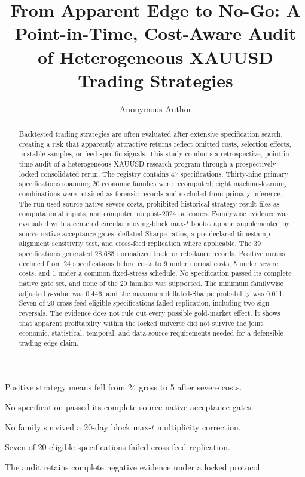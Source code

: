 \documentclass[a4paper,fleqn]{cas-sc}
\begin{document}
\let\WriteBookmarks\relax
\def\floatpagepagefraction{.8}
\def\textpagefraction{.1}

\title[mode=title]{From Apparent Edge to No-Go: A Point-in-Time, Cost-Aware Audit of Heterogeneous XAUUSD Trading Strategies}

\author[1]{Anonymous Author}

\begin{abstract}
Backtested trading strategies are often evaluated after extensive specification search, creating a risk that apparently attractive returns reflect omitted costs, selection effects, unstable samples, or feed-specific signals. This study conducts a retrospective, point-in-time audit of a heterogeneous XAUUSD research program through a prospectively locked consolidated rerun. The registry contains 47 specifications. Thirty-nine primary specifications spanning 20 economic families were recomputed; eight machine-learning combinations were retained as forensic records and excluded from primary inference. The run used source-native severe costs, prohibited historical strategy-result files as computational inputs, and computed no post-2024 outcomes. Familywise evidence was evaluated with a centered circular moving-block max-$t$ bootstrap and supplemented by source-native acceptance gates, deflated Sharpe ratios, a pre-declared timestamp-alignment sensitivity test, and cross-feed replication where applicable. The 39 specifications generated 28,685 normalized trade or rebalance records. Positive means declined from 24 specifications before costs to 9 under normal costs, 5 under severe costs, and 1 under a common fixed-stress schedule. No specification passed its complete native gate set, and none of the 20 families was supported. The minimum familywise adjusted $p$-value was 0.446, and the maximum deflated-Sharpe probability was 0.011. Seven of 20 cross-feed-eligible specifications failed replication, including two sign reversals. The evidence does not rule out every possible gold-market effect. It shows that apparent profitability within the locked universe did not survive the joint economic, statistical, temporal, and data-source requirements needed for a defensible trading-edge claim.
\end{abstract}

\begin{highlights}
\item Positive strategy means fell from 24 gross to 5 after severe costs.
\item No specification passed its complete source-native acceptance gates.
\item No family survived a 20-day block max-$t$ multiplicity correction.
\item Seven of 20 eligible specifications failed cross-feed replication.
\item The audit retains complete negative evidence under a locked protocol.
\end{highlights}
\end{document}
